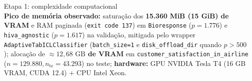 \documentclass[aspectratio=169,11pt]{beamer}
\begin{document}
\begin{frame}{Etapa 1: complexidade computacional}
    \footnotesize
    \vspace{0.4em}
    \\
    \footnotesize \textbf{Pico de memória observado:} saturação dos \textbf{15.360 MiB (15 GiB) de VRAM} e RAM paginada (\texttt{exit code 137}) em \texttt{Bioresponse} ($p=1.776$) e \texttt{hiva\_agnostic} ($p=1.617$) na validação, mitigada pelo wrapper \texttt{AdaptiveTabICLClassifier} (\texttt{batch\_size=1} e \texttt{disk\_offload\_dir} quando $p > 500$); alocação de \textbf{$\approx 12,68\text{ GB}$ de VRAM} em \texttt{customer\_satisfaction\_in\_airline} ($n=129.880, n_{\mathrm{te}}=43.293$) no teste; \textbf{hardware:} GPU NVIDIA Tesla T4 (16 GB VRAM, CUDA 12.4) + CPU Intel Xeon.
\end{frame}
\end{document}
